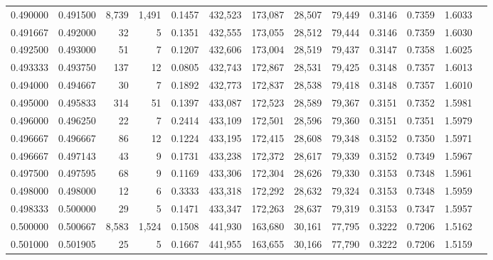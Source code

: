 \begin{tabular}{rrrrrrrrrrrrr}
0.490000 & 0.491500 &  8,739 & 1,491 &                                     0.1457 & 432,523 & 173,087 &  28,507 &  79,449 & 0.3146 & 0.7359 & 1.6033 \\
0.491667 & 0.492000 &     32 &     5 &                                     0.1351 & 432,555 & 173,055 &  28,512 &  79,444 & 0.3146 & 0.7359 & 1.6030 \\
0.492500 & 0.493000 &     51 &     7 &                                     0.1207 & 432,606 & 173,004 &  28,519 &  79,437 & 0.3147 & 0.7358 & 1.6025 \\
0.493333 & 0.493750 &    137 &    12 &                                     0.0805 & 432,743 & 172,867 &  28,531 &  79,425 & 0.3148 & 0.7357 & 1.6013 \\
0.494000 & 0.494667 &     30 &     7 &                                     0.1892 & 432,773 & 172,837 &  28,538 &  79,418 & 0.3148 & 0.7357 & 1.6010 \\
0.495000 & 0.495833 &    314 &    51 &                                     0.1397 & 433,087 & 172,523 &  28,589 &  79,367 & 0.3151 & 0.7352 & 1.5981 \\
0.496000 & 0.496250 &     22 &     7 &                                     0.2414 & 433,109 & 172,501 &  28,596 &  79,360 & 0.3151 & 0.7351 & 1.5979 \\
0.496667 & 0.496667 &     86 &    12 &                                     0.1224 & 433,195 & 172,415 &  28,608 &  79,348 & 0.3152 & 0.7350 & 1.5971 \\
0.496667 & 0.497143 &     43 &     9 &                                     0.1731 & 433,238 & 172,372 &  28,617 &  79,339 & 0.3152 & 0.7349 & 1.5967 \\
0.497500 & 0.497595 &     68 &     9 &                                     0.1169 & 433,306 & 172,304 &  28,626 &  79,330 & 0.3153 & 0.7348 & 1.5961 \\
0.498000 & 0.498000 &     12 &     6 &                                     0.3333 & 433,318 & 172,292 &  28,632 &  79,324 & 0.3153 & 0.7348 & 1.5959 \\
0.498333 & 0.500000 &     29 &     5 &                                     0.1471 & 433,347 & 172,263 &  28,637 &  79,319 & 0.3153 & 0.7347 & 1.5957 \\
0.500000 & 0.500667 &  8,583 & 1,524 &                                     0.1508 & 441,930 & 163,680 &  30,161 &  77,795 & 0.3222 & 0.7206 & 1.5162 \\
0.501000 & 0.501905 &     25 &     5 &                                     0.1667 & 441,955 & 163,655 &  30,166 &  77,790 & 0.3222 & 0.7206 & 1.5159 \\

\end{tabular}
